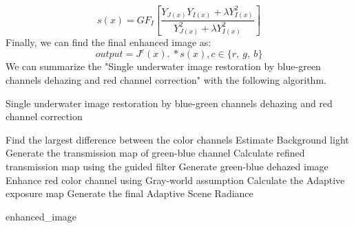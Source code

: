 \documentclass[a4paper,11pt,oneside]{article}
\begin{document}
 $$s(x)=GF_{I}[\frac{Y_{J(x)}Y_{I(x)}+\lambda Y_{I(x)}^{2}}{Y_{J(x)}^{2}+\lambda Y_{I(x)}^{2}}]$$
 Finally, we can find the final enhanced image as:
 $$output=J^{c}(x).\ *s(x), c\in\{r,\ g,\ b\}$$
 We can summarize the "Single underwater image restoration by blue-green channels dehazing and red channel correction" \cite{26} with the following algorithm.
 \begin{algorithm}
	\caption*{Single underwater image restoration by blue-green channels dehazing and red channel correction \cite{26}}
	\begin{algorithmic}

    \State Find the largest difference between the color channels
    \State Estimate Background light 
    \State Generate the transmission map of green-blue channel
    \State Calculate refined transmission map using the guided filter
    \State Generate green-blue dehazed image
    \State
    \State Enhance red color channel using Gray-world assumption
    \State
    \State Calculate the Adaptive exposure map
    \State Generate the final Adaptive Scene Radiance
    \State
    
    \Return enhanced\_image
\EndProcedure

\end{algorithmic}
\end{algorithm}
\end{document}
